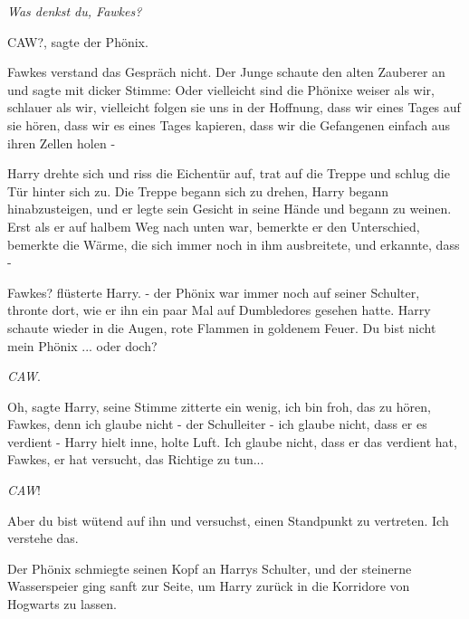 \emph{Was denkst du, Fawkes?}

\glqq{}CAW?\grqq{}, sagte der Phönix.

Fawkes verstand das Gespräch nicht. Der Junge schaute den alten Zauberer an und
sagte mit dicker Stimme: \glqq{}Oder vielleicht sind die Phönixe weiser als wir,
schlauer als wir, vielleicht folgen sie uns in der Hoffnung, dass wir eines
Tages auf sie hören, dass wir es eines Tages kapieren, dass wir die Gefangenen
einfach aus ihren Zellen holen -\grqq{}

Harry drehte sich und riss die Eichentür auf, trat auf die Treppe und schlug die
Tür hinter sich zu. Die Treppe begann sich zu drehen, Harry begann
hinabzusteigen, und er legte sein Gesicht in seine Hände und begann zu weinen.
Erst als er auf halbem Weg nach unten war, bemerkte er den Unterschied, bemerkte
die Wärme, die sich immer noch in ihm ausbreitete, und erkannte, dass -

\glqq{}Fawkes? flüsterte Harry. - der Phönix war immer noch auf seiner Schulter,
thronte dort, wie er ihn ein paar Mal auf Dumbledores gesehen hatte. Harry
schaute wieder in die Augen, rote Flammen in goldenem Feuer. \glqq{}Du bist nicht
mein Phönix ... oder doch?\grqq{}

\emph{CAW}.

\glqq{}Oh\grqq{}, sagte Harry, seine Stimme zitterte ein wenig, \glqq{}ich bin
froh, das zu hören, Fawkes, denn ich glaube nicht - der Schulleiter - ich glaube
nicht, dass er es verdient -\grqq{} Harry hielt inne, holte Luft. \glqq{}Ich
glaube nicht, dass er das verdient hat, Fawkes, er hat versucht, das Richtige zu
tun...\grqq{}

\emph{CAW}!

\glqq{}Aber du bist wütend auf ihn und versuchst, einen Standpunkt zu vertreten.
Ich verstehe das.\grqq{}

Der Phönix schmiegte seinen Kopf an Harrys Schulter, und der steinerne
Wasserspeier ging sanft zur Seite, um Harry zurück in die Korridore von Hogwarts
zu lassen.

